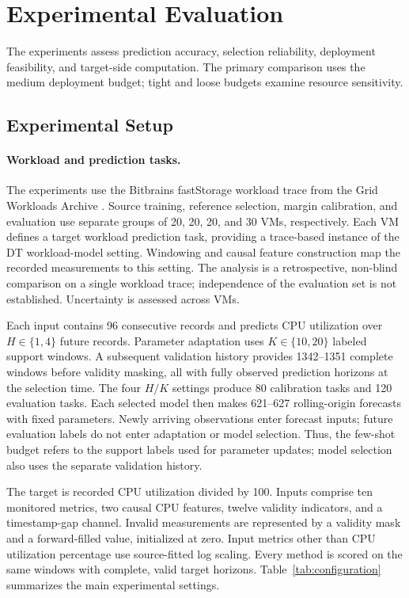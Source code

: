 \documentclass[a4paper,fleqn]{cas-sc}
\begin{document}
\section{Experimental Evaluation}
\label{sec:experiments}
The experiments assess prediction accuracy, selection reliability, deployment
feasibility, and target-side computation. The primary comparison uses the
medium deployment budget; tight and loose budgets examine resource sensitivity.

\subsection{Experimental Setup}
\label{subsec:experimental-setup}
\paragraph{Workload and prediction tasks.}
The experiments use the Bitbrains fastStorage workload trace from the Grid
Workloads Archive \cite{refBitbrains,refGWA}. Source training, reference
selection, margin calibration, and evaluation use separate groups of 20, 20,
20, and 30 VMs, respectively. Each VM defines a target workload prediction
task, providing a trace-based instance of the DT workload-model setting.
Windowing and causal feature construction map the recorded measurements to
this setting. The analysis is a retrospective, non-blind comparison on a single
workload trace; independence of the evaluation set is not established.
Uncertainty is assessed across VMs.

Each input contains 96 consecutive records and predicts CPU utilization over
$H\in\{1,4\}$ future records. Parameter adaptation uses $K\in\{10,20\}$
labeled support windows. A subsequent validation history provides
1342--1351 complete windows before validity masking, all with fully observed
prediction horizons at the selection time. The four $H/K$ settings produce
80 calibration tasks and 120 evaluation tasks. Each selected model then makes
621--627 rolling-origin forecasts with fixed parameters. Newly arriving
observations enter forecast inputs; future evaluation labels do not enter
adaptation or model selection. Thus, the few-shot budget refers to the
support labels used for parameter updates; model selection also uses the
separate validation history.

The target is recorded CPU utilization divided by 100. Inputs comprise ten
monitored metrics, two causal CPU features, twelve validity indicators, and
a timestamp-gap channel. Invalid measurements are represented by a validity
mask and a forward-filled value, initialized at zero. Input metrics other than
CPU utilization percentage use source-fitted log scaling. Every method is
scored on the same windows with complete, valid target horizons.
Table~\ref{tab:configuration} summarizes the main experimental settings.
\end{document}
